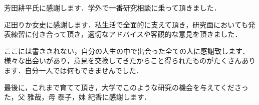 芳田耕平氏に感謝します．学外で一番研究相談に乗って頂きました．

疋田りか女史に感謝します．私生活で全面的に支えて頂き，研究面においても発表練習に付き合って頂き，適切なアドバイスや客観的な意見を頂きました．

ここには書ききれない，自分の人生の中で出会った全ての人に感謝致します．様々な出会いがあり，意見を交換してきたからこと得られたものがたくさんあります．自分一人では何もできませんでした．

最後に，これまで育てて頂き，大学でこのような研究の機会を与えてくださった，父 雅哉，母 泰子，妹 紀香に感謝します．



